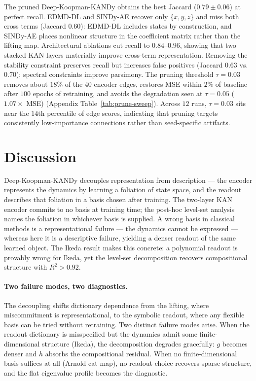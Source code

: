 \documentclass{article}
\begin{document}
The pruned Deep-Koopman-KANDy obtains the best Jaccard ($0.79\pm 0.06$) at
perfect recall. EDMD-DL and SINDy-AE recover only $\{x,y,z\}$ and miss both
cross terms (Jaccard $0.60$): EDMD-DL includes states by construction, and
SINDy-AE places nonlinear structure in the coefficient matrix rather than the
lifting map. Architectural ablations cut recall to $0.84$--$0.96$, showing
that two stacked KAN layers materially improve cross-term representation.
Removing the stability constraint preserves recall but increases false
positives (Jaccard $0.63$ vs.\ $0.70$); spectral constraints improve parsimony.
The pruning threshold $\tau=0.03$ removes about $18\%$ of the $40$ encoder
edges, restores MSE within $2\%$ of baseline after $100$ epochs of retraining,
and avoids the degradation seen at $\tau=0.05$ ($1.07\times$ MSE)
(Appendix Table~\ref{tab:prune-sweep}). Across $12$ runs, $\tau=0.03$ sits near
the $14$th percentile of edge scores, indicating that pruning targets
consistently low-importance connections rather than seed-specific artifacts.


\section*{Discussion}
Deep-Koopman-KANDy decouples representation from description --- the encoder represents the dynamics by learning a foliation of state space, and the readout describes that foliation in a basis chosen after training. The two-layer KAN encoder commits to no basis at training time; the post-hoc level-set analysis names the foliation in whichever basis is supplied. A wrong basis in classical methods is a representational failure --- the dynamics cannot be expressed --- whereas here it is a descriptive failure, yielding a denser readout of the same learned object. The Ikeda result makes this concrete: a polynomial readout is provably wrong for Ikeda, yet the level-set decomposition recovers compositional structure with $R^2 > 0.92$.

\paragraph{Two failure modes, two diagnostics.}
The decoupling shifts dictionary dependence from the lifting, where miscommitment is representational, to the symbolic readout, where any flexible basis can be tried without retraining. Two distinct failure modes arise. When the readout dictionary is misspecified but the dynamics admit some finite-dimensional structure (Ikeda), the decomposition degrades gracefully: $g$ becomes denser and $h$ absorbs the compositional residual. When no finite-dimensional basis suffices at all (Arnold cat map), no readout choice recovers sparse structure, and the flat eigenvalue profile becomes the diagnostic.
\end{document}
